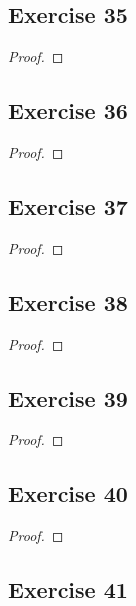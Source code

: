 \documentclass[14pt]{extarticle}
\begin{document}
\subsection{Exercise 35}

\begin{proof}

\end{proof}

\subsection{Exercise 36}

\begin{proof}

\end{proof}

\subsection{Exercise 37}

\begin{proof}

\end{proof}

\subsection{Exercise 38}

\begin{proof}

\end{proof}

\subsection{Exercise 39}

\begin{proof}

\end{proof}

\subsection{Exercise 40}

\begin{proof}

\end{proof}

\subsection{Exercise 41}
\end{document}
